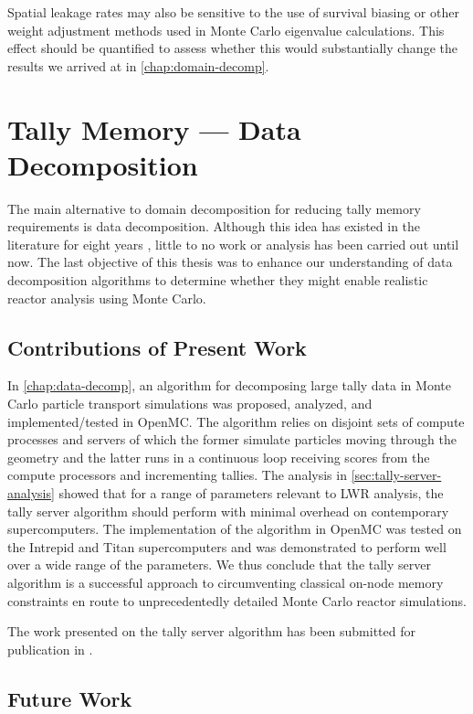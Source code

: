 Spatial leakage rates may also be sensitive to the use of survival biasing or
other weight adjustment methods used in Monte Carlo eigenvalue
calculations. This effect should be quantified to assess whether this would
substantially change the results we arrived at in \autoref{chap:domain-decomp}.

\section{Tally Memory --- Data Decomposition}

The main alternative to domain decomposition for reducing tally memory
requirements is data decomposition. Although this idea has existed in the
literature for eight years \cite{trans-brown-2004}, little to no work or
analysis has been carried out until now. The last objective of this thesis was
to enhance our understanding of data decomposition algorithms to determine
whether they might enable realistic reactor analysis using Monte Carlo.

\subsection{Contributions of Present Work}

In \autoref{chap:data-decomp}, an algorithm for decomposing large tally data in
Monte Carlo particle transport simulations was proposed, analyzed, and
implemented/tested in OpenMC. The algorithm relies on disjoint sets of compute
processes and servers of which the former simulate particles moving through the
geometry and the latter runs in a continuous loop receiving scores from the
compute processors and incrementing tallies. The analysis in
\autoref{sec:tally-server-analysis} showed that for a range of parameters
relevant to LWR analysis, the tally server algorithm should perform with minimal
overhead on contemporary supercomputers. The implementation of the algorithm in
OpenMC was tested on the Intrepid and Titan supercomputers and was demonstrated
to perform well over a wide range of the parameters. We thus conclude that the
tally server algorithm is a successful approach to circumventing classical
on-node memory constraints en route to unprecedentedly detailed Monte Carlo
reactor simulations.

The work presented on the tally server algorithm has been submitted for
publication in \cite{jcp-romano-2013}.

\subsection{Future Work}


